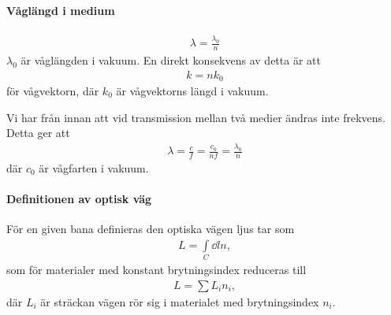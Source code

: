 \paragraph{Våglängd i medium}
\begin{align*}
	\lambda = \frac{\lambda_0}{n}
\end{align*}
$\lambda_0$ är våglängden i vakuum. En direkt konsekvens av detta är att
\begin{align*}
	k = nk_0
\end{align*}
för vågvektorn, där $k_0$ är vågvektorns längd i vakuum.

\deriv
Vi har från innan att vid transmission mellan två medier ändras inte frekvens. Detta ger att
\begin{align*}
	\lambda = \frac{c}{f} = \frac{c_0}{nf} = \frac{\lambda_0}{n}
\end{align*}
där $c_0$ är vågfarten i vakuum.

\paragraph{Definitionen av optisk väg}
För en given bana definieras den optiska vägen ljus tar som
\begin{align*}
	L = \int\limits_{C}\dd{l}n,
\end{align*}
som för materialer med konstant brytningsindex reduceras till
\begin{align*}
	L = \sum L_in_i,
\end{align*}
där $L_i$ är sträckan vägen rör sig i materialet med brytningsindex $n_i$.